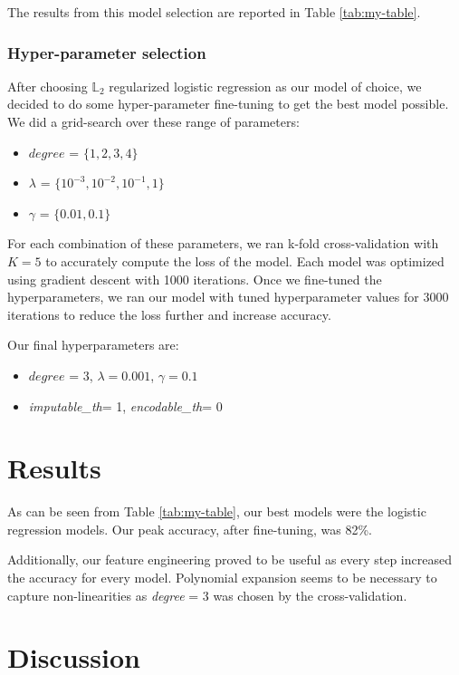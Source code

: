 \documentclass[10pt,conference,compsocconf]{IEEEtran}
\begin{document}
The results from this model selection are reported in Table \ref{tab:my-table}.


\subsubsection{Hyper-parameter selection}

After choosing  $\mathbb{L}_2$ regularized logistic regression as our model of choice, we decided to do some hyper-parameter fine-tuning to get the best model possible.
We did a grid-search over these range of parameters:
\begin{itemize}
    \item $\textit{degree}$ = $\{1, 2, 3, 4\}$
    \item $\lambda$ = $\{10^{-3}, 10^{-2}, 10^{-1}, 1\}$
    \item $\gamma$ = $\{0.01, 0.1\}$
\end{itemize}
\hfill

For each combination of these parameters, we ran k-fold cross-validation with $K=5$ to accurately compute the loss of the model. Each model was optimized using gradient descent with 1000 iterations. Once we fine-tuned the hyperparameters, we ran our model with tuned hyperparameter values for 3000 iterations to reduce the loss further and increase accuracy.

Our final hyperparameters are:

\begin{itemize}
    \item  $\textit{degree}$ = 3, $\lambda = 0.001$, $\gamma = 0.1$ 
    \item \textit{imputable\_th}= 1, \textit{encodable\_th}= 0
\end{itemize}

\section{Results}

As can be seen from Table \ref{tab:my-table}, our best models were the logistic regression models. Our peak accuracy, after fine-tuning, was 82\%.

Additionally, our feature engineering proved to be useful as every step increased the accuracy for every model. Polynomial expansion seems to be necessary to capture non-linearities as \textit{degree} = 3 was chosen by the cross-validation.

\section{Discussion}
\end{document}
